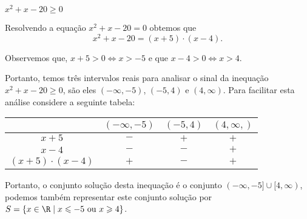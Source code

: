  \begin{exem}
 $x^2 + x - 20 \geqslant 0$
 
 Resolvendo a equação $x^2 + x - 20 = 0$ obtemos que
\begin{equation}
x^2 + x - 20  = (x+5) \cdot (x-4) . 
\end{equation}
 
 Observemos que, $x+5> 0 \Leftrightarrow x> -5$ e que $x-4> 0 \Leftrightarrow x>4$. 
 
 Portanto, temos três intervalos reais para analisar o sinal da inequação $x^2 + x - 20 \geqslant 0$, são eles $(-\infty, -5)$, $(-5, 4)$ e $(4, \infty)$. Para facilitar esta análise considere a seguinte tabela:
 
 \begin{table}[H]
 \centering
 \begin{tabular}{|c|c|c|c|} \hline
 \rowcolor{cinza}
                      & $(-\infty, -5)$ & $(-5, 4)$ & $(4, \infty,)$ \\ \hline
                $x+5$ & $-$             & $+$       & $+$ \\ \hline
                $x-4$ & $-$             & $-$       & $+$ \\ \hline
 $(x+5) \cdot (x-4)$  & $+$             & $-$       & $+$ \\ \hline
 \end{tabular}
 \end{table}
 
 Portanto, o conjunto solução desta inequação é o conjunto $(-\infty, -5] \cup [4, \infty)$, podemos também representar este conjunto solução por $S= \left\{ x \in \R \mid x \leqslant -5 \text{ ou } x \geqslant 4 \right\}$.
 \end{exem}
 
